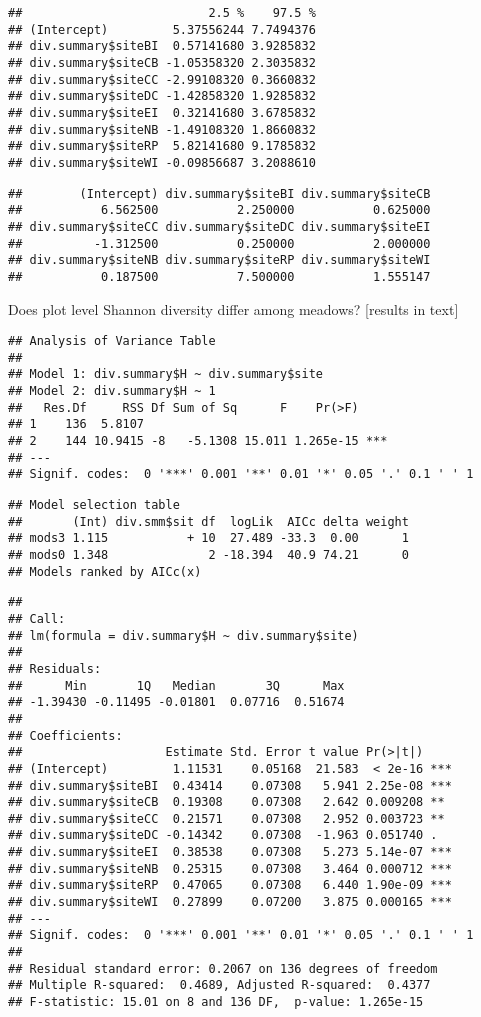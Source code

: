 \documentclass[]{article}
\begin{document}
\begin{verbatim}
##                          2.5 %    97.5 %
## (Intercept)         5.37556244 7.7494376
## div.summary$siteBI  0.57141680 3.9285832
## div.summary$siteCB -1.05358320 2.3035832
## div.summary$siteCC -2.99108320 0.3660832
## div.summary$siteDC -1.42858320 1.9285832
## div.summary$siteEI  0.32141680 3.6785832
## div.summary$siteNB -1.49108320 1.8660832
## div.summary$siteRP  5.82141680 9.1785832
## div.summary$siteWI -0.09856687 3.2088610
\end{verbatim}

\begin{verbatim}
##        (Intercept) div.summary$siteBI div.summary$siteCB 
##           6.562500           2.250000           0.625000 
## div.summary$siteCC div.summary$siteDC div.summary$siteEI 
##          -1.312500           0.250000           2.000000 
## div.summary$siteNB div.summary$siteRP div.summary$siteWI 
##           0.187500           7.500000           1.555147
\end{verbatim}

Does plot level Shannon diversity differ among meadows? {[}results in
text{]}

\begin{verbatim}
## Analysis of Variance Table
## 
## Model 1: div.summary$H ~ div.summary$site
## Model 2: div.summary$H ~ 1
##   Res.Df     RSS Df Sum of Sq      F    Pr(>F)    
## 1    136  5.8107                                  
## 2    144 10.9415 -8   -5.1308 15.011 1.265e-15 ***
## ---
## Signif. codes:  0 '***' 0.001 '**' 0.01 '*' 0.05 '.' 0.1 ' ' 1
\end{verbatim}

\begin{verbatim}
## Model selection table 
##       (Int) div.smm$sit df  logLik  AICc delta weight
## mods3 1.115           + 10  27.489 -33.3  0.00      1
## mods0 1.348              2 -18.394  40.9 74.21      0
## Models ranked by AICc(x)
\end{verbatim}

\begin{verbatim}
## 
## Call:
## lm(formula = div.summary$H ~ div.summary$site)
## 
## Residuals:
##      Min       1Q   Median       3Q      Max 
## -1.39430 -0.11495 -0.01801  0.07716  0.51674 
## 
## Coefficients:
##                    Estimate Std. Error t value Pr(>|t|)    
## (Intercept)         1.11531    0.05168  21.583  < 2e-16 ***
## div.summary$siteBI  0.43414    0.07308   5.941 2.25e-08 ***
## div.summary$siteCB  0.19308    0.07308   2.642 0.009208 ** 
## div.summary$siteCC  0.21571    0.07308   2.952 0.003723 ** 
## div.summary$siteDC -0.14342    0.07308  -1.963 0.051740 .  
## div.summary$siteEI  0.38538    0.07308   5.273 5.14e-07 ***
## div.summary$siteNB  0.25315    0.07308   3.464 0.000712 ***
## div.summary$siteRP  0.47065    0.07308   6.440 1.90e-09 ***
## div.summary$siteWI  0.27899    0.07200   3.875 0.000165 ***
## ---
## Signif. codes:  0 '***' 0.001 '**' 0.01 '*' 0.05 '.' 0.1 ' ' 1
## 
## Residual standard error: 0.2067 on 136 degrees of freedom
## Multiple R-squared:  0.4689, Adjusted R-squared:  0.4377 
## F-statistic: 15.01 on 8 and 136 DF,  p-value: 1.265e-15
\end{verbatim}
\end{document}
